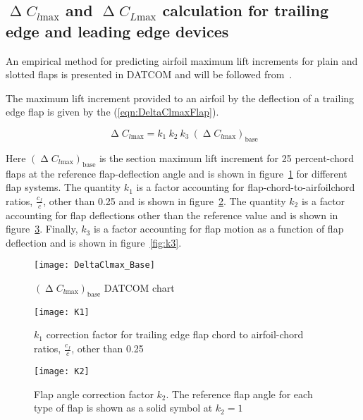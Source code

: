 \subsection{$\upDelta C_{l\text{max}}$ and  $\upDelta C_{L\text{max}}$ calculation for trailing edge and leading edge devices}
An empirical method for predicting airfoil maximum lift increments for plain and slotted flaps is presented in \gls{DATCOM} and will be followed from~\cite{sforza2014commercial}.

The maximum lift increment provided to an airfoil by the deflection of a trailing edge flap is given by the (\ref{eqn:DeltaClmaxFlap}).

\begin{equation}
\upDelta C_{l\text{max}}=k_1\ k_2\ k_3\ \left(\upDelta C_{l\text{max}}\right)_{\text{base}}
\label{eqn:DeltaClmaxFlap}
\end{equation}

\noindent
Here $\left(\upDelta C_{l\text{max}}\right)_{\text{base}}$ is the section maximum lift increment for 25 percent-chord flaps at the reference flap-deflection angle and is shown in figure~\ref{fig:DeltaClmaxBase} for different flap systems. The quantity $k_1$ is a factor accounting for flap-chord-to-airfoilchord ratios, $\frac{c_{f}}{c}$, other than 0.25 and is shown in figure~\ref{fig:k1}. The quantity $k_2$ is a factor accounting for flap deflections other than the reference value and is shown in figure~\ref{fig:k2}. Finally, $k_3$ is a factor accounting for flap motion as a function of flap deflection and is shown in figure~\ref{fig:k3}.

\begin{figure}[!b]
  \centering
  \texttt{[image: DeltaClmax\_Base]}
  \caption{$\left(\upDelta C_{l\text{max}}\right)_{\text{base}}$ DATCOM chart}
  \label{fig:DeltaClmaxBase}
\end{figure}

\begin{figure}[H]
  \centering
  \texttt{[image: K1]}
  \caption{$k_1$ correction factor for trailing edge flap chord to airfoil-chord ratios, $\frac{c_{f}}{c}$, other than 0.25}
  \label{fig:k1}
\end{figure}

\begin{figure}[H]
  \centering
  \texttt{[image: K2]}
  \caption{Flap angle correction factor $k_2$. The reference flap angle for each type of flap is shown as a solid symbol at $k_2=1$}
  \label{fig:k2}
\end{figure}

